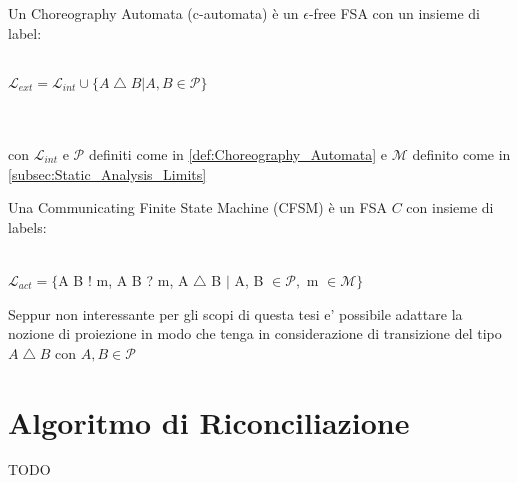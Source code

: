 \begin{definition}
    Un Choreography Automata (c-automata) è un $\epsilon$-free FSA con un insieme di label:\\ \\
    \centerline{$\mathcal{L}_{ext} = \mathcal{L}_{int} \cup \{ A \bigtriangleup B | A, B \in \mathcal{P}\}$}\\ \\
    con $\mathcal{L}_{int}$ e $\mathcal{P}$ definiti come in \ref{def:Choreography_Automata} e $\mathcal{M}$ definito come in \ref{subsec:Static_Analysis_Limits}
\end{definition}

\begin{definition}
    Una Communicating Finite State Machine (CFSM) è un FSA $C$ con insieme di labels:
    \\ \\
    \centerline{$\mathcal{L}_{act} = \{$A B ! m, A B ? m, A $\bigtriangleup$ B $|$ A, B $ \in \mathcal{P},$ m $ \in \mathcal{M}\}$}
\end{definition}

\begin{remark}
    Seppur non interessante per gli scopi di questa tesi e' possibile adattare la nozione di proiezione in modo che tenga in considerazione di transizione del tipo $A \bigtriangleup B$ con $A, B \in \mathcal{P}$
\end{remark}

\newpage %
\section{Algoritmo di Riconciliazione}
TODO

